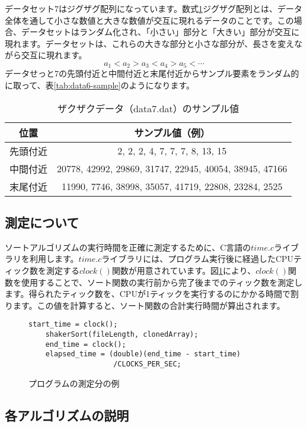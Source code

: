 \documentclass[a4j, 12pt]{jarticle}
\begin{document}
データセット7はジグザグ配列になっています。数式\ref{tab:data7-sample}ジグザグ配列とは、データ全体を通して小さな数値と大きな数値が交互に現れるデータのことです。この場合、データセットはランダム化され、「小さい」部分と「大きい」部分が交互に現れます。データセットは、これらの大きな部分と小さな部分が、長さを変えながら交互に現れます。\\
\begin{equation}\label{zigzagsequence}
  a_1 < a_2 > a_3 < a_4 > a_5 < \cdots
\end{equation}
データせっと7の先頭付近と中間付近と末尾付近からサンプル要素をランダム的に取って、表\ref{tab:data6-sample}のようになります。
\begin{table}[H]
  \centering
  \caption{ザクザクデータ（data7.dat）のサンプル値}
  \begin{tabular}{|c|c|}
    \hline
    位置 & サンプル値（例） \\
    \hline
    先頭付近 & 2, 2, 2, 4, 7, 7, 7, 8, 13, 15 \\
    中間付近 & 20778, 42992, 29869, 31747, 22945, 40054, 38945, 47166 \\
    末尾付近 & 11990, 7746, 38998, 35057, 41719, 22808, 23284, 2525\\
    \hline
  \end{tabular}\label{tab:data7-sample}
\end{table}
\subsection{測定について}
ソートアルゴリズムの実行時間を正確に測定するために、C言語の$time.c$ライブラリを利用します。$time.c$ライブラリには、プログラム実行後に経過したCPUティック数を測定する$clock()$関数が用意されています。図\ref{fig:clockcode}により、$clock()$関数を使用することで、ソート関数の実行前から完了後までのティック数を測定します。得られたティック数を、CPUが1ティックを実行するのにかかる時間で割ります。この値を計算すると、ソート関数の合計実行時間が算出されます。
\begin{figure}[htbp]
  \centering
  \caption{プログラムの測定分の例}\label{fig:clockcode}
  \begin{lstlisting}[basicstyle=\ttfamily\small]
    start_time = clock();
    shakerSort(fileLength, clonedArray);
    end_time = clock();
    elapsed_time = (double)(end_time - start_time)
                    /CLOCKS_PER_SEC;
  \end{lstlisting}
\end{figure}
\newpage
\subsection{各アルゴリズムの説明}
\end{document}
